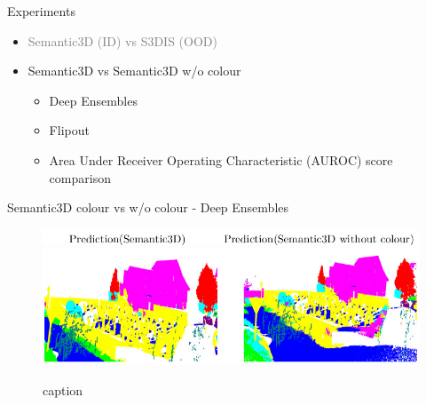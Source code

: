 \documentclass[aspectratio=169]{beamer}
\begin{document}
\begin{frame}{Experiments}
    \begin{itemize}
        \item \textcolor{gray}{Semantic3D (ID) vs S3DIS (OOD)}
        
        \item Semantic3D vs Semantic3D w/o colour
        \begin{itemize}
            \item Deep Ensembles
            \item Flipout
            \item Area Under Receiver Operating Characteristic (AUROC) score comparison
        \end{itemize}
    \end{itemize}
\end{frame}
\begin{frame}{Semantic3D colour vs w/o colour - Deep Ensembles}
    \begin{figure}
        \centering
        \includegraphics[scale=0.5]{images/ood2/top_legend_ood2.jpg}
        \includegraphics[scale=0.5]{images/ood2/Sem3d_OOD2_DE.jpg}
        \caption{caption}
        \label{fig:DE_ood2_op}
    \end{figure}
\end{frame}
\end{document}
